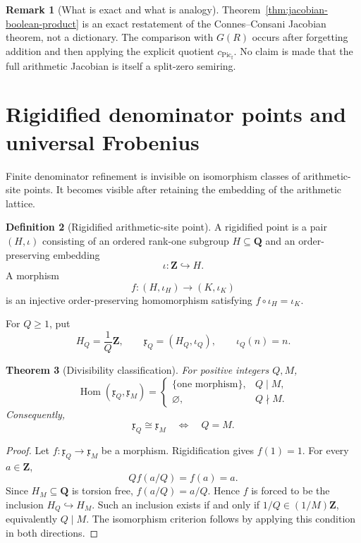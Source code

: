 \documentclass[11pt]{amsart}
\numberwithin{equation}{section}
\newtheorem{theorem}{Theorem}[section]
\theoremstyle{definition}
\newtheorem{definition}[theorem]{Definition}
\newtheorem{remark}[theorem]{Remark}
\newcommand{\Z}{\mathbf Z}
\newcommand{\Q}{\mathbf Q}
\newcommand{\Picf}{\operatorname{Pic}_{\mathrm f}}
\begin{document}
\begin{remark}[What is exact and what is analogy]
Theorem~\ref{thm:jacobian-boolean-product} is an exact restatement of the
Connes--Consani Jacobian theorem, not a dictionary.  The comparison with
$G(R)$ occurs after forgetting addition and then applying the explicit
quotient $c_{\Picf}$.  No claim is made that the full arithmetic Jacobian
is itself a split-zero semiring.
\end{remark}

\section{Rigidified denominator points and universal Frobenius}
\label{sec:rigidified-denominators}

Finite denominator refinement is invisible on isomorphism classes of
arithmetic-site points.  It becomes visible after retaining the embedding
of the arithmetic lattice.

\begin{definition}[Rigidified arithmetic-site point]
\label{def:rigidified-point}
A rigidified point is a pair $(H,\iota)$ consisting of an ordered rank-one
subgroup $H\subseteq\Q$ and an order-preserving embedding
\[
\iota:\Z\hookrightarrow H.
\]
A morphism
\[
f:(H,\iota_H)\longrightarrow(K,\iota_K)
\]
is an injective order-preserving homomorphism satisfying
$f\circ\iota_H=\iota_K$.

For $Q\geq1$, put
\[
H_Q=\frac1Q\Z,
\qquad
\mathfrak x_Q=(H_Q,\iota_Q),
\qquad
\iota_Q(n)=n.
\]
\end{definition}

\begin{theorem}[Divisibility classification]
\label{thm:rigidified-divisibility}
For positive integers $Q,M$,
\[
\operatorname{Hom}(\mathfrak x_Q,\mathfrak x_M)
=
\begin{cases}
\{\text{one morphism}\},&Q\mid M,\\
\varnothing,&Q\nmid M.
\end{cases}
\]
Consequently,
\[
\mathfrak x_Q\cong\mathfrak x_M
\quad\Longleftrightarrow\quad
Q=M.
\]
\end{theorem}

\begin{proof}
Let $f:\mathfrak x_Q\to\mathfrak x_M$ be a morphism.  Rigidification gives
$f(1)=1$.  For every $a\in\Z$,
\[
Qf(a/Q)=f(a)=a.
\]
Since $H_M\subseteq\Q$ is torsion free, $f(a/Q)=a/Q$.  Hence $f$ is forced
to be the inclusion $H_Q\hookrightarrow H_M$.  Such an inclusion exists
if and only if $1/Q\in(1/M)\Z$, equivalently $Q\mid M$.  The isomorphism
criterion follows by applying this condition in both directions.
\end{proof}
\end{document}
